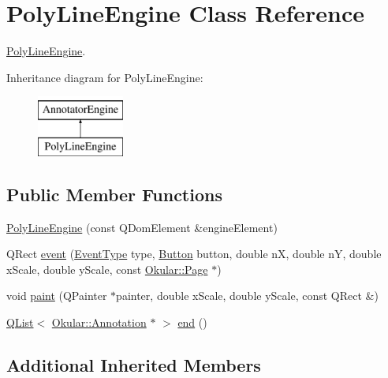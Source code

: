 \hypertarget{classPolyLineEngine}{\section{Poly\+Line\+Engine Class Reference}
\label{classPolyLineEngine}
}


\hyperlink{classPolyLineEngine}{Poly\+Line\+Engine}.  


Inheritance diagram for Poly\+Line\+Engine\+:\begin{figure}[H]
\begin{center}
\leavevmode
\includegraphics[height=2.000000cm]{classPolyLineEngine}
\end{center}
\end{figure}
\subsection*{Public Member Functions}
\begin{DoxyCompactItemize}
\item 
\hyperlink{classPolyLineEngine_a07ffb1f3ce4b55915df6b8641a634761}{Poly\+Line\+Engine} (const Q\+Dom\+Element \&engine\+Element)
\item 
Q\+Rect \hyperlink{classPolyLineEngine_a822e6058b9e407228c83298678d3aa94}{event} (\hyperlink{classAnnotatorEngine_a00fb22eb4cb6eafb056f9066031db133}{Event\+Type} type, \hyperlink{classAnnotatorEngine_ac2e3b75e12bacbb6974d15dd53954567}{Button} button, double n\+X, double n\+Y, double x\+Scale, double y\+Scale, const \hyperlink{classOkular_1_1Page}{Okular\+::\+Page} $\ast$)
\item 
void \hyperlink{classPolyLineEngine_ae2399ba29c9bc734ffe53db0310e54bd}{paint} (Q\+Painter $\ast$painter, double x\+Scale, double y\+Scale, const Q\+Rect \&)
\item 
\hyperlink{classQList}{Q\+List}$<$ \hyperlink{classOkular_1_1Annotation}{Okular\+::\+Annotation} $\ast$ $>$ \hyperlink{classPolyLineEngine_ac5d84e9165cd9ab117d161aa935d102e}{end} ()
\end{DoxyCompactItemize}
\subsection*{Additional Inherited Members}


